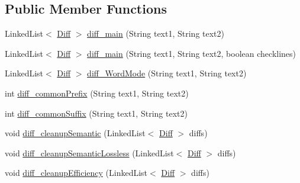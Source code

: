 \subsection*{Public Member Functions}
\begin{DoxyCompactItemize}
\item 
Linked\+List$<$ \hyperlink{classorg_1_1buildmlearn_1_1toolkit_1_1utilities_1_1diff__match__patch_1_1Diff}{Diff} $>$ \hyperlink{classorg_1_1buildmlearn_1_1toolkit_1_1utilities_1_1diff__match__patch_ac3a49d63289ea35216363dfe99c1cf21}{diff\+\_\+main} (String text1, String text2)
\item 
Linked\+List$<$ \hyperlink{classorg_1_1buildmlearn_1_1toolkit_1_1utilities_1_1diff__match__patch_1_1Diff}{Diff} $>$ \hyperlink{classorg_1_1buildmlearn_1_1toolkit_1_1utilities_1_1diff__match__patch_a7562296717e7b97146eef8eec8fd270a}{diff\+\_\+main} (String text1, String text2, boolean checklines)
\item 
Linked\+List$<$ \hyperlink{classorg_1_1buildmlearn_1_1toolkit_1_1utilities_1_1diff__match__patch_1_1Diff}{Diff} $>$ \hyperlink{classorg_1_1buildmlearn_1_1toolkit_1_1utilities_1_1diff__match__patch_ad029f054ec515159187232a4caa6329f}{diff\+\_\+\+Word\+Mode} (String text1, String text2)
\item 
int \hyperlink{classorg_1_1buildmlearn_1_1toolkit_1_1utilities_1_1diff__match__patch_aac329de2538a84de56f903724d0eb687}{diff\+\_\+common\+Prefix} (String text1, String text2)
\item 
int \hyperlink{classorg_1_1buildmlearn_1_1toolkit_1_1utilities_1_1diff__match__patch_aceacaaaf8bea312257d927602fac6d75}{diff\+\_\+common\+Suffix} (String text1, String text2)
\item 
void \hyperlink{classorg_1_1buildmlearn_1_1toolkit_1_1utilities_1_1diff__match__patch_a24fbf15c6ca66d20072d48f8314ade8c}{diff\+\_\+cleanup\+Semantic} (Linked\+List$<$ \hyperlink{classorg_1_1buildmlearn_1_1toolkit_1_1utilities_1_1diff__match__patch_1_1Diff}{Diff} $>$ diffs)
\item 
void \hyperlink{classorg_1_1buildmlearn_1_1toolkit_1_1utilities_1_1diff__match__patch_ad28a657eb0eeaaf185e72905df9b0e77}{diff\+\_\+cleanup\+Semantic\+Lossless} (Linked\+List$<$ \hyperlink{classorg_1_1buildmlearn_1_1toolkit_1_1utilities_1_1diff__match__patch_1_1Diff}{Diff} $>$ diffs)
\item 
void \hyperlink{classorg_1_1buildmlearn_1_1toolkit_1_1utilities_1_1diff__match__patch_a8bef7e6bafbed49ad8afc87a30b838a5}{diff\+\_\+cleanup\+Efficiency} (Linked\+List$<$ \hyperlink{classorg_1_1buildmlearn_1_1toolkit_1_1utilities_1_1diff__match__patch_1_1Diff}{Diff} $>$ diffs)

\end{DoxyCompactItemize}
